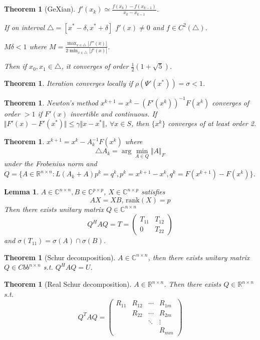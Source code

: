 \documentclass[12pt,b5paper,notitlepage]{article}
\theoremstyle{definition}
\theoremstyle{remark}
\theoremstyle{plain}
\newtheorem{theorem}[definition]{Theorem}
\newtheorem{lemma}[definition]{Lemma}
\newcommand{\Cbb}{\mathbb C}
\newcommand{\Rbb}{\mathbb R}
\newcommand{\rank}{\mathrm{rank}}
\newcommand{\dps}{\displaystyle}
\numberwithin{equation}{section}
\newcommand{\st}{ \textit{ s.t. }}
\renewcommand{\|}{\Vert}
\begin{document}
\begin{theorem}[GeXian]
     $ f'(x_k)\simeq \dps\frac{f(x_k)-f(x_{k-1})}{x_k-x_{k-1}} $. 
    
     If on interval  $ \triangle=[x^*-\delta,x^*+\delta] $  $ f'(x)\neq 0 $ and  $ f\in C^2(\triangle) $.
     
      $ M\delta<1 $ where  $ M=\dps\frac{\max_{x\in\triangle}|f''(x)|}{2\min_{x\in \triangle}|f'(x)|} $.
      
      Then if  $ x_0,x_1\in \triangle $, it converges of order  $ \dps\frac{1}{2}(1+\sqrt{5}) $.  
\end{theorem}
\begin{theorem}
    Iteration converges locally if  $ \rho(\Psi'(x^*))=\sigma<1 $. 
\end{theorem}
\begin{theorem}
  Newton's method  $ x^{k+1}=x^k-(F'(x^k))^{-1}F(x^k) $ converges of order  $ >1 $  if  $ F'(x) $ invertible and continuous. If  $ \|F'(x)-F'(x^*)\| \leq \gamma\|x-x^*\| $,  $ \forall x\in S $, then  $ \{x^k\} $ converges of at least order 2.   
\end{theorem}
\begin{theorem}
   $ x^{k+1}=x^k-A_k^{-1}F(x^k) $ where 
   \[\triangle A_k=\arg \min_{A\in Q}\|A\|_F\]
   under the Frobenius norm and  $ Q=\{A\in \Rbb^{n\times n}:L(A_k+A)p^k=q^k,p^k=x^{k+1}-x^k,q^k=F(x^{k+1})-F(x^k)\} $.
\end{theorem}
\begin{lemma}
   $ A\in \Cbb^{n\times n},B\in \Cbb^{p\times p} $,  $ X\in \Cbb^{n\times p} $ satisfies 
   \[AX=XB,\,\rank(X)=p\]
   Then there exists unitary matrix  $ Q\in \Cbb^{n\times n} $ 
   \[Q^HAQ=T=\begin{pmatrix}
   T_{11} & T_{12} \\
   0&T_{22}
   \end{pmatrix}\]
   and  $ \sigma(T_{11})=\sigma(A)\cap \sigma(B) $.    
\end{lemma}
\begin{theorem}[Schur decomposition]
     $ A\in \Cbb^{n\times n} $, then there exists unitary matrix  $ Q\in Cbb^{n\times n} $ \st   $ Q^HAQ=U $.  
\end{theorem}
\begin{theorem}[Real Schur decomposition]
   $ A\in \Rbb^{n\times n} $. Then there exists  $ Q\in \Rbb^{n\times n} $ \st 
   \[Q^TAQ=\begin{pmatrix}
    R_{11}&R_{12}&\cdots&R_{1m}\\
    &R_{22}&\cdots&R_{2m}\\
    &&\ddots&\vdots\\
    & & &R_{mm}
   \end{pmatrix}\]  
\end{theorem}
\end{document}
